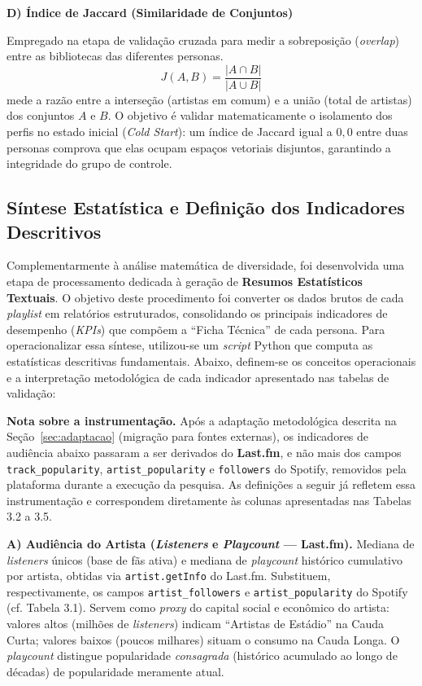 \documentclass[12pt, %
openright,
oneside, %
a4paper,    %
english,   %
brazil]{facom-ufu-abntex2}
\begin{document}
\textbf{D) Índice de Jaccard (Similaridade de Conjuntos)}

Empregado na etapa de validação cruzada para medir a sobreposição (\emph{overlap})
entre as bibliotecas das diferentes personas.
\[ J(A,B) = \frac{|A \cap B|}{|A \cup B|} \]
mede a razão entre a interseção (artistas em comum) e a união (total de artistas)
dos conjuntos $A$ e $B$. O objetivo é validar matematicamente o isolamento dos
perfis no estado inicial (\emph{Cold Start}): um índice de Jaccard igual a $0{,}0$
entre duas personas comprova que elas ocupam espaços vetoriais disjuntos,
garantindo a integridade do grupo de controle.

\subsection{Síntese Estatística e Definição dos Indicadores Descritivos}

Complementarmente à análise matemática de diversidade, foi desenvolvida uma etapa
de processamento dedicada à geração de \textbf{Resumos Estatísticos Textuais}. O
objetivo deste procedimento foi converter os dados brutos de cada \emph{playlist}
em relatórios estruturados, consolidando os principais indicadores de desempenho
(\emph{KPIs}) que compõem a ``Ficha Técnica'' de cada persona. Para operacionalizar
essa síntese, utilizou-se um \emph{script} Python que computa as estatísticas
descritivas fundamentais. Abaixo, definem-se os conceitos operacionais e a
interpretação metodológica de cada indicador apresentado nas tabelas de validação:

\noindent\textbf{Nota sobre a instrumentação.} Após a adaptação metodológica
descrita na Seção~\ref{sec:adaptacao} (migração para fontes externas), os
indicadores de audiência abaixo passaram a ser derivados do \textbf{Last.fm}, e
não mais dos campos \texttt{track\_popularity}, \texttt{artist\_popularity} e
\texttt{followers} do Spotify, removidos pela plataforma durante a execução da
pesquisa. As definições a seguir já refletem essa instrumentação e correspondem
diretamente às colunas apresentadas nas Tabelas 3.2 a 3.5.

\textbf{A) Audiência do Artista (\emph{Listeners} e \emph{Playcount} ---
Last.fm).} Mediana de \emph{listeners} únicos (base de fãs ativa) e mediana de
\emph{playcount} histórico cumulativo por artista, obtidas via
\texttt{artist.getInfo} do Last.fm. Substituem, respectivamente, os campos
\texttt{artist\_followers} e \texttt{artist\_popularity} do Spotify (cf.
Tabela 3.1). Servem como \emph{proxy} do capital social e econômico do artista:
valores altos (milhões de \emph{listeners}) indicam ``Artistas de Estádio'' na
Cauda Curta; valores baixos (poucos milhares) situam o consumo na Cauda Longa. O
\emph{playcount} distingue popularidade \emph{consagrada} (histórico acumulado
ao longo de décadas) de popularidade meramente atual.
\end{document}
